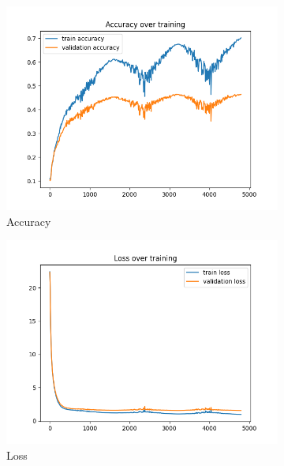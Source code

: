 \documentclass[a4paper]{article}
\begin{document}
\begin{figure}[h]
	\centering
	\begin{subfigure}{0.3\textwidth}
		\centering
		\includegraphics[width=\linewidth]{images/exercise4_acc.png}
		\caption{Accuracy}
	\end{subfigure}
	\begin{subfigure}{0.3\textwidth}
		\centering
		\includegraphics[width=\linewidth]{images/exercise4_loss.png}
		\caption{Loss}
	\end{subfigure}
	\begin{subfigure}{0.3\textwidth}
		\centering

\end{subfigure}
\end{figure}
\end{document}
